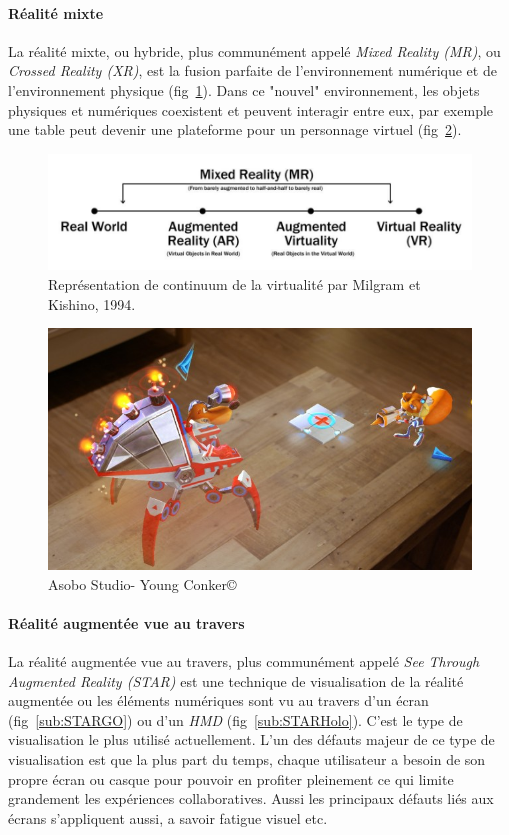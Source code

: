 \paragraph{Réalité mixte}
La réalité mixte, ou hybride, plus communément appelé \emph{Mixed Reality (MR)}, ou \emph{Crossed Reality (XR)}, est la fusion parfaite de l'environnement numérique et de l'environnement physique (fig~\ref{fig:realityspectrum}). Dans ce "nouvel" environnement, les objets physiques et numériques coexistent et peuvent interagir entre eux, par exemple une table peut devenir une plateforme pour un personnage virtuel (fig~\ref{fig:youngconker}).

\begin{figure}[h]
\centering
\includegraphics[scale=0.7]{images/RealitySpectrum}
\caption{Représentation de continuum de la virtualité par Milgram et Kishino, 1994.}
\label{fig:realityspectrum}
\end{figure}

\begin{figure}
\centering
\includegraphics[scale=0.4]{images/youngconker}
\caption{Asobo Studio\texttrademark - Young Conker\copyright}
\label{fig:youngconker}
\end{figure}

\paragraph{Réalité augmentée vue au travers}
La réalité augmentée vue au travers, plus communément appelé \emph{See Through Augmented Reality (STAR)} est une technique de visualisation de la réalité augmentée ou les éléments numériques sont vu au travers d'un écran (fig~\ref{sub:STARGO}) ou d'un \emph{HMD} (fig~\ref{sub:STARHolo}). C'est le type de visualisation le plus  utilisé actuellement. L'un des défauts majeur de ce type de visualisation est que la plus part du temps, chaque utilisateur a besoin de son propre écran ou casque pour pouvoir en profiter pleinement ce qui limite grandement les expériences collaboratives. Aussi les principaux défauts liés aux écrans s'appliquent aussi, a savoir fatigue visuel etc.  

